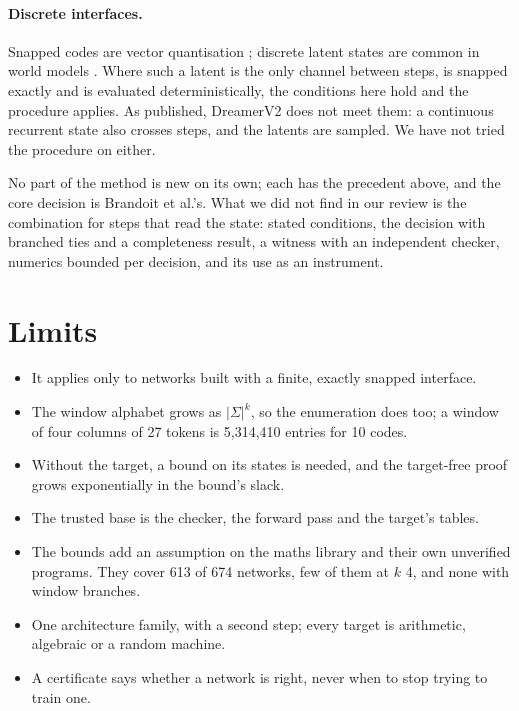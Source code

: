 \documentclass[11pt]{article}
\newcommand{\pn}[2]{#2}
\theoremstyle{definition}
\begin{document}
\paragraph{Discrete interfaces.} Snapped codes are vector quantisation
\citep{van-den-oord-2017-vq-vae-neural-discrete-representation}; discrete latent states are common in
world models \citep{hafner-2020-dreamerv2-discrete-world-models}. Where such a latent is the only
channel between steps, is snapped exactly and is evaluated deterministically, the conditions here hold
and the procedure applies. As published, DreamerV2 does not meet them: a continuous recurrent state also
crosses steps, and the latents are sampled. We have not tried the procedure on either.

No part of the method is new on its own; each has the precedent above, and the core decision is
Brandoit et al.'s. What we did not find in our review is the combination for steps that read the state:
stated conditions, the decision with branched ties and a completeness result, a witness with an independent
checker, numerics bounded per decision, and its use as an instrument.

\section{Limits}

\begin{itemize}
\item It applies only to networks built with a finite, exactly snapped interface.
\item The window alphabet grows as $|\Sigma|^k$, so the enumeration does too; a window of four
columns of 27 tokens is \pn{recert-largest-entries}{5{,}314{,}410} entries for
\pn{recert-largest-codes}{10} codes.
\item Without the target, a bound on its states is needed, and the target-free proof grows
exponentially in the bound's slack.
\item The trusted base is the checker, the forward pass and the target's tables.
\item The bounds add an assumption on the maths library and their own unverified programs. They cover
\pn{bound-tables}{613} of \pn{recert-certified-networks}{674} networks, few of them at $k$ 4, and
none with window branches.
\item One architecture family, with a second step; every target is arithmetic, algebraic or a random
machine.
\item A certificate says whether a network is right, never when to stop trying to train one.
\end{itemize}
\end{document}

